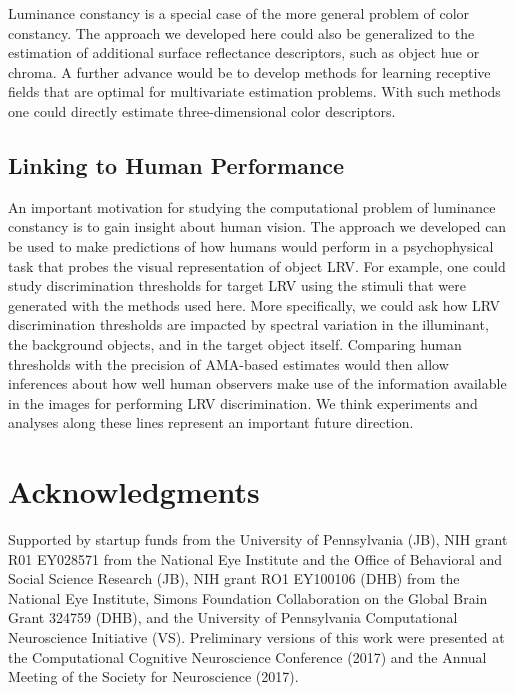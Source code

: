 \documentclass{jov}
\begin{document}
Luminance constancy is a special case of the more general problem of color constancy.
The approach we developed here could also be generalized to the estimation of additional surface reflectance descriptors, such as object hue or chroma.
A further advance would be to develop methods for learning receptive fields that are optimal for multivariate estimation problems. 
With such methods one could directly estimate three-dimensional color descriptors.

\subsection{Linking to Human Performance}

An important motivation for studying the computational problem of luminance constancy is to gain insight about human vision.
The approach we developed can be used to make predictions of how humans would perform in a psychophysical task that probes the visual representation of object LRV.
For example, one could study discrimination thresholds for target LRV using the stimuli that were generated with the methods used here.
More specifically, we could ask how LRV discrimination thresholds are impacted by spectral variation in the illuminant, the background objects, and in the target object itself.
Comparing human thresholds with the precision of AMA-based estimates would then allow inferences about how well human observers make use of the information available in the images for performing LRV discrimination.
We think experiments and analyses along these lines represent an important future direction.

\section{Acknowledgments} \label{Acknowledgments}

Supported by startup funds from the University of Pennsylvania (JB), NIH grant R01 EY028571 from the National Eye Institute and the Office of Behavioral and Social Science Research (JB), NIH grant RO1 EY100106 (DHB) from the National Eye Institute, Simons Foundation Collaboration on the Global Brain Grant 324759 (DHB), and the University of Pennsylvania Computational Neuroscience Initiative (VS).  Preliminary versions of this work were presented at the Computational Cognitive Neuroscience Conference (2017) and the Annual Meeting of the Society for Neuroscience (2017).



\end{document}
